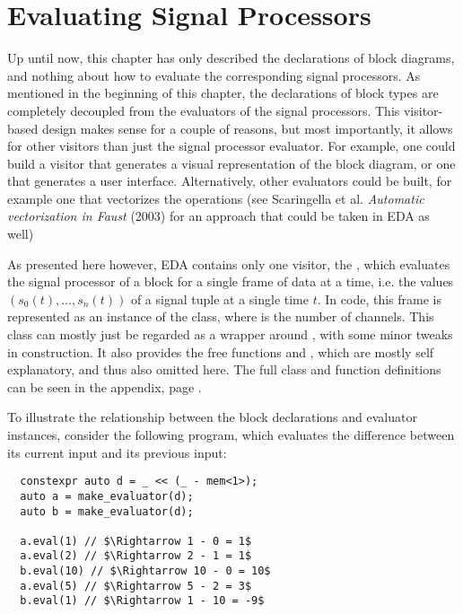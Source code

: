 \section{Evaluating Signal Processors}
\label{sec:eda_eval}

Up until now, this chapter has only described the declarations of block diagrams, and nothing about how to
evaluate the corresponding signal processors. As mentioned in the beginning of this chapter, the declarations
of block types are completely decoupled from the evaluators of the signal processors. This visitor-based
design makes sense for a couple of reasons, but most importantly, it allows for other visitors than just the
signal processor evaluator. For example, one could build a visitor that generates a visual representation of
the block diagram, or one that generates a user interface. Alternatively, other evaluators could be built,
for example one that vectorizes the operations (see Scaringella et al. \emph{Automatic vectorization in Faust} (2003)
\autocite{faust_auto_vec} for an approach that could be taken in EDA as well)

As presented here however, EDA contains only one visitor, the , which evaluates the
signal processor of a block for a single frame of data at a time, i.e. the values $(s_0(t), \dots, s_n(t))$ of a
signal tuple at a single time $t$. In code, this frame is represented as an instance of
the  class, where
 is the number of channels. This class can mostly just be regarded as a wrapper around , with some minor tweaks in construction. It also provides the free functions
 and , which are mostly self explanatory, and
thus also omitted here. The full class and function definitions can be seen in the appendix, page
\pageref{codefile:include/eda/frame.hpp}.

To illustrate the relationship between the block declarations and evaluator instances, consider the following
program, which evaluates the difference between its current input and its previous input:

\begin{verbatim}
  constexpr auto d = _ << (_ - mem<1>);
  auto a = make_evaluator(d);
  auto b = make_evaluator(d);
  
  a.eval(1) // $\Rightarrow 1 - 0 = 1$
  a.eval(2) // $\Rightarrow 2 - 1 = 1$
  b.eval(10) // $\Rightarrow 10 - 0 = 10$
  a.eval(5) // $\Rightarrow 5 - 2 = 3$
  b.eval(1) // $\Rightarrow 1 - 10 = -9$
\end{verbatim}

